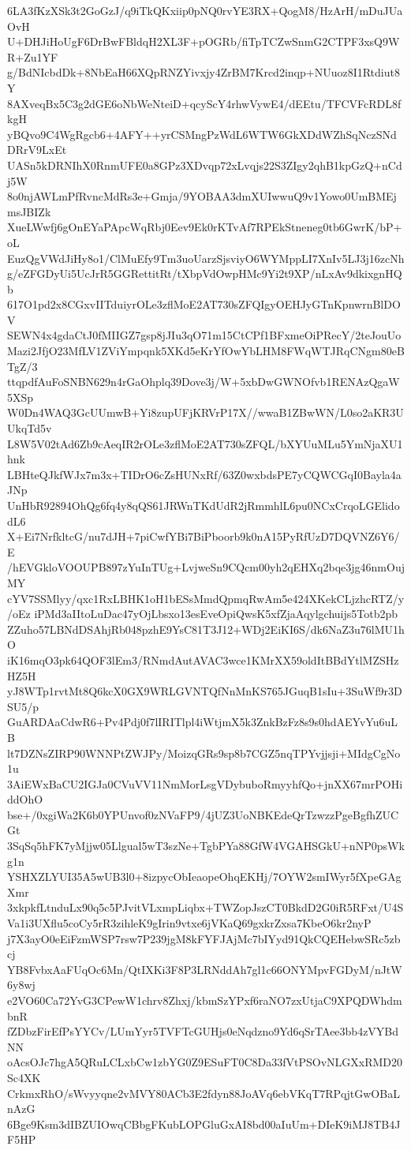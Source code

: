 6LA3fKzXSk3t2GoGzJ/q9iTkQKxiip0pNQ0rvYE3RX+QogM8/HzArH/mDuJUaOvH
U+DHJiHoUgF6DrBwFBldqH2XL3F+pOGRb/fiTpTCZwSnmG2CTPF3xsQ9WR+Zu1YF
g/BdNIcbdDk+8NbEaH66XQpRNZYivxjy4ZrBM7Krcd2inqp+NUuoz8I1Rtdiut8Y
8AXveqBx5C3g2dGE6oNbWeNteiD+qcyScY4rhwVywE4/dEEtu/TFCVFcRDL8fkgH
yBQvo9C4WgRgcb6+4AFY++yrCSMngPzWdL6WTW6GkXDdWZhSqNczSNdDRrV9LxEt
UASn5kDRNIhX0RnmUFE0a8GPz3XDvqp72xLvqjs22S3ZIgy2qhB1kpGzQ+nCdj5W
8o0njAWLmPfRvncMdRs3e+Gmja/9YOBAA3dmXUIwwuQ9v1Yowo0UmBMEjmsJBIZk
XueLWwfj6gOnEYaPApcWqRbj0Eev9Ek0rKTvAf7RPEkStneneg0tb6GwrK/bP+oL
EuzQgVWdJiHy8o1/ClMuEfy9Tm3uoUarzSjsviyO6WYMppLI7XnIv5LJ3j16zcNh
g/eZFGDyUi5UcJrR5GGRettitRt/tXbpVdOwpHMc9Yi2t9XP/nLxAv9dkixgnHQb
617O1pd2x8CGxvIITduiyrOLe3zflMoE2AT730sZFQIgyOEHJyGTnKpnwrnBlDOV
SEWN4x4gdaCtJ0fMIIGZ7gsp8jJIu3qO71m15CtCPf1BFxmeOiPRecY/2teJouUo
Mazi2JfjO23MfLV1ZViYmpqnk5XKd5eKrYfOwYbLHM8FWqWTJRqCNgm80eBTgZ/3
ttqpdfAuFoSNBN629n4rGaOhplq39Dove3j/W+5xbDwGWNOfvb1RENAzQgaW5XSp
W0Dn4WAQ3GcUUmwB+Yi8zupUFjKRVrP17X//wwaB1ZBwWN/L0so2aKR3UUkqTd5v
L8W5V02tAd6Zb9cAeqIR2rOLe3zflMoE2AT730sZFQL/bXYUuMLu5YmNjaXU1hnk
LBHteQJkfWJx7m3x+TIDrO6cZsHUNxRf/63Z0wxbdsPE7yCQWCGqI0Bayla4aJNp
UnHbR92894OhQg6fq4y8qQS61JRWnTKdUdR2jRmmhlL6pu0NCxCrqoLGElidodL6
X+Ei7NrfkltcG/nu7dJH+7piCwfYBi7BiPboorb9k0nA15PyRfUzD7DQVNZ6Y6/E
/hEVGkloVOOUPB897zYuInTUg+LvjweSn9CQcm00yh2qEHXq2bqe3jg46nmOujMY
cYV7SSMlyy/qxc1RxLBHK1oH1bESsMmdQpmqRwAm5e424XKekCLjzhcRTZ/y/oEz
iPMd3aIItoLuDac47yOjLbsxo13esEveOpiQwsK5xfZjaAqylgchuijs5Totb2pb
ZZuho57LBNdDSAhjRb048pzhE9YsC81T3J12+WDj2EiKI6S/dk6NaZ3u76lMU1hO
iK16mqO3pk64QOF3lEm3/RNmdAutAVAC3wce1KMrXX59oldItBBdYtlMZSHzHZ5H
yJ8WTp1rvtMt8Q6kcX0GX9WRLGVNTQfNnMnKS765JGuqB1sIu+3SuWf9r3DSU5/p
GuARDAaCdwR6+Pv4Pdj0f7lIRITlpl4iWtjmX5k3ZnkBzFz8s9s0hdAEYvYu6uLB
lt7DZNsZIRP90WNNPtZWJPy/MoizqGRs9sp8b7CGZ5nqTPYvjjsji+MIdgCgNo1u
3AiEWxBaCU2IGJa0CVuVV11NmMorLsgVDybuboRmyyhfQo+jnXX67mrPOHiddOhO
bse+/0xgiWa2K6b0YPUnvof0zNVaFP9/4jUZ3UoNBKEdeQrTzwzzPgeBgfhZUCGt
3SqSq5hFK7yMjjw05Llgual5wT3szNe+TgbPYa88GfW4VGAHSGkU+nNP0psWkg1n
YSHXZLYUI35A5wUB3l0+8izpycObIeaopeOhqEKHj/7OYW2smIWyr5fXpeGAgXmr
3xkpkfLtnduLx90q5c5PJvitVLxmpLiqbx+TWZopJszCT0BkdD2G0iR5RFxt/U4S
Va1i3UXflu5coCy5rR3zihleK9gIrin9vtxe6jVKaQ69gxkrZxsa7KbeO6kr2nyP
j7X3ayO0eEiFzmWSP7rsw7P239jgM8kFYFJAjMc7bIYyd91QkCQEHebwSRc5zbcj
YB8FvbxAaFUqOc6Mn/QtIXKi3F8P3LRNddAh7gl1c66ONYMpvFGDyM/nJtW6y8wj
e2VO60Ca72YvG3CPewW1chrv8Zhxj/kbmSzYPxf6raNO7zxUtjaC9XPQDWhdmbnR
fZDbzFirEfPsYYCv/LUmYyr5TVFTcGUHjs0eNqdzno9Yd6qSrTAee3bb4zVYBdNN
oAcsOJc7hgA5QRuLCLxbCw1zbYG0Z9ESuFT0C8Da33fVtPSOvNLGXxRMD20Sc4XK
CrkmxRhO/sWvyyqne2vMVY80ACb3E2fdyn88JoAVq6ebVKqT7RPqjtGwOBaLnAzG
6Bge9Ksm3dIBZUIOwqCBbgFKubLOPGluGxAI8bd00aIuUm+DIeK9iMJ8TB4JF5HP
